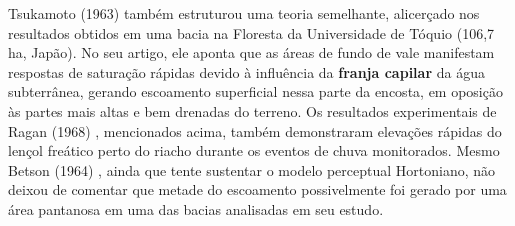 \documentclass[./main.tex]{subfiles}
\begin{document}
\noindent Tsukamoto (1963) \cite{Tsukamoto1963} também estruturou uma teoria semelhante, alicerçado nos resultados obtidos em uma bacia na Floresta da Universidade de Tóquio (106,7 ha, Japão). No seu artigo, ele aponta que as áreas de fundo de vale manifestam respostas de saturação rápidas devido à influência da \textbf{franja capilar} da água subterrânea, gerando escoamento superficial nessa parte da encosta, em oposição às partes mais altas e bem drenadas do terreno. Os resultados experimentais de Ragan (1968) \cite{Ragan1968}, mencionados acima, também demonstraram elevações rápidas do lençol freático perto do riacho durante os eventos de chuva monitorados. Mesmo Betson (1964) \cite{Betson1964}, ainda que tente sustentar o modelo perceptual Hortoniano, não deixou de comentar que metade do escoamento possivelmente foi gerado por uma área pantanosa em uma das bacias analisadas em seu estudo.
\end{document}
